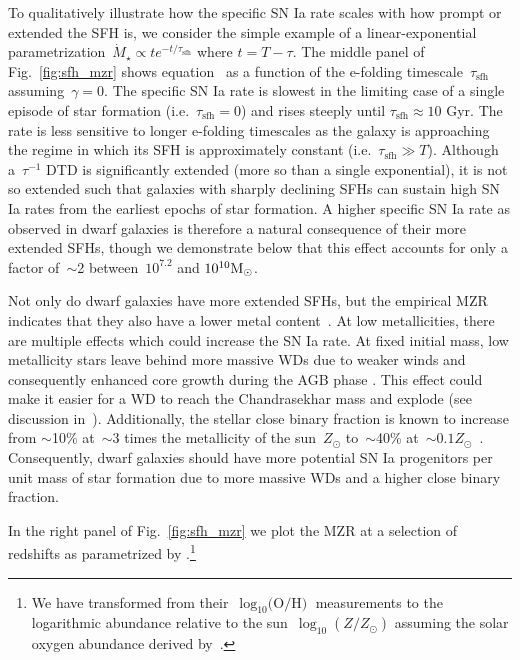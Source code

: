 \documentclass[ms.tex]{subfiles}
\begin{document}
To qualitatively illustrate how the specific SN Ia rate scales with how prompt
or extended the SFH is, we consider the simple example of a linear-exponential
parametrization~$\dot{M}_\star \propto te^{-t/\tau_\text{sfh}}$ where
$t = T - \tau$.
The middle panel of Fig.~\ref{fig:sfh_mzr} shows equation~ as
a function of the e-folding timescale~$\tau_\text{sfh}$ assuming~$\gamma = 0$.
The specific SN Ia rate is slowest in the limiting case of a single episode of
star formation (i.e.~$\tau_\text{sfh} = 0$) and rises steeply until
$\tau_\text{sfh} \approx 10$ Gyr.
The rate is less sensitive to longer e-folding timescales as the galaxy is
approaching the regime in which its SFH is approximately constant
(i.e.~$\tau_\text{sfh} \gg T$).
Although a~$\tau^{-1}$ DTD is significantly extended (more so than a single
exponential), it is not so extended such that galaxies with sharply declining
SFHs can sustain high SN Ia rates from the earliest epochs of star formation.
A higher specific SN Ia rate as observed in dwarf galaxies is therefore a
natural consequence of their more extended SFHs, though we demonstrate below
that this effect accounts for only a factor of~$\sim$2 between~$10^{7.2}$ and
$10^{10} \text{M}_\odot$.
\par
Not only do dwarf galaxies have more extended SFHs, but the empirical MZR
indicates that they also have a lower metal content~\citep{Tremonti2004,
Gallazzi2005, Zahid2011, Kirby2013}.
At low metallicities, there are multiple effects which could increase the SN Ia
rate.
At fixed initial mass, low metallicity stars leave behind more massive WDs due
to weaker winds and consequently enhanced core growth during the AGB phase
\citep{Umeda1999, Willson2000, Marigo2007, Meng2008, Zhao2012, Kalirai2014}.
This effect could make it easier for a WD to reach the Chandrasekhar mass and
explode (see discussion in~\citealt{Kistler2013}).
Additionally, the stellar close binary fraction is known to increase from
$\sim$10\% at~$\sim$3 times the metallicity of the sun~$Z_\odot$ to~$\sim$40\%
at~$\sim0.1 Z_\odot$~\citep{Moe2019}.
Consequently, dwarf galaxies should have more potential SN Ia progenitors per
unit mass of star formation due to more massive WDs and a higher close binary
fraction.
\par
In the right panel of Fig.~\ref{fig:sfh_mzr} we plot the MZR at a selection of
redshifts as parametrized by
\citet[][see their equation 5]{Zahid2014}.\footnote{
	We have transformed from their~$\log_{10}\text{(O/H)}$ measurements to the
	logarithmic abundance relative to the sun~$\log_{10}(Z / Z_\odot)$ assuming
	the solar oxygen abundance derived by~\citet{Asplund2009}.
}
\end{document}
